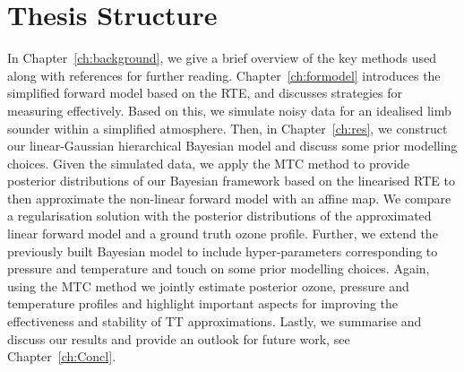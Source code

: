 \section{Thesis Structure}
In Chapter~\ref{ch:background}, we give a brief overview of the key methods used along with references for further reading.
Chapter~\ref{ch:formodel} introduces the simplified forward model based on the RTE, and discusses strategies for measuring effectively.
Based on this, we simulate noisy data for an idealised limb sounder within a simplified atmosphere.
Then, in Chapter~\ref{ch:res}, we construct our linear-Gaussian hierarchical Bayesian model and discuss some prior modelling choices.
Given the simulated data, we apply the MTC method to provide posterior distributions of our Bayesian framework based on the linearised RTE to then approximate the non-linear forward model with an affine map. 
We compare a regularisation solution with the posterior distributions of the approximated linear forward model and a ground truth ozone profile.
Further, we extend the previously built Bayesian model to include hyper-parameters corresponding to pressure and temperature and touch on some prior modelling choices. 
Again, using the MTC method we jointly estimate posterior ozone, pressure and temperature profiles and highlight important aspects for improving the effectiveness and stability of TT approximations.
Lastly, we summarise and discuss our results and provide an outlook for future work, see Chapter~\ref{ch:Concl}.

